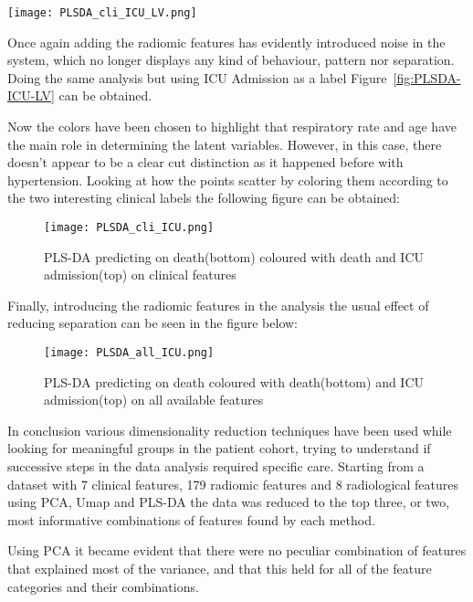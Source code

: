 \begin{figure*}[htbp]
  		\texttt{[image: PLSDA\_cli\_ICU\_LV.png]}
          \caption{PLS-DA predicting on death coloured with Age and respiratory rate on clinical features\label{fig:PLSDA-ICU-LV}}
\end{figure*}

Once again adding the radiomic features has evidently introduced noise in the system, which no longer displays any kind of behaviour, pattern nor separation.
Doing the same analysis but using ICU Admission as a label Figure~\ref{fig:PLSDA-ICU-LV} can be obtained. 

Now the colors have been chosen to highlight that respiratory rate and age have the main role in determining the latent variables. However, in this case, there doesn't appear to be a clear cut distinction as it happened before with hypertension.
Looking at how the points scatter by coloring them according to the two interesting clinical labels the following figure can be obtained:

\begin{figure}[H]
  		\texttt{[image: PLSDA\_cli\_ICU.png]}
          \caption{PLS-DA predicting on death(bottom) coloured with death and ICU admission(top) on clinical features\label{fig:PLSDA-ICU}}
\end{figure}

Finally, introducing the radiomic features in the analysis the usual effect of reducing separation can be seen in the figure below:

\begin{figure}[H]
  		\texttt{[image: PLSDA\_all\_ICU.png]}
          \caption{PLS-DA predicting on death coloured with death(bottom) and ICU admission(top) on all available features\label{fig:PLSDA-ICU-all}}
\end{figure}
 
In conclusion various dimensionality reduction techniques have been used while looking for meaningful groups in the patient cohort, trying to understand if successive steps in the data analysis required specific care. Starting from a dataset with 7 clinical features, 179 radiomic features and 8 radiological features using PCA, Umap and PLS-DA the data was reduced to the top three, or two, most informative combinations of features found by each method.

Using PCA it became evident that there were no peculiar combination of features that explained most of the variance, and that this held for all of the feature categories and their combinations. 

